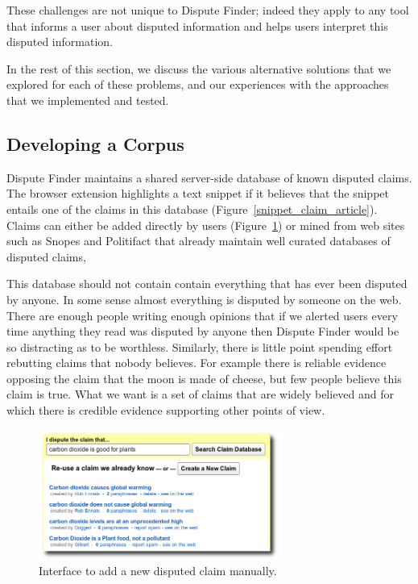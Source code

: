 \documentclass{www2010-accepted}
\begin{document}
These challenges are not unique to Dispute Finder; indeed they apply to any tool that informs a user about disputed information and helps users interpret this disputed information.

In the rest of this section, we discuss the various alternative solutions that we explored for each of these problems, and our experiences with the approaches that we implemented and tested.


\subsection{Developing a Corpus}
\label{sec:disputed}

Dispute Finder maintains a shared server-side database of known disputed claims. The browser extension highlights a text snippet if it believes that the snippet entails one of the claims in this database (Figure~\ref{snippet_claim_article}). Claims can either be added directly by users (Figure~\ref{add_claim}) or mined from web sites such as Snopes and Politifact that already maintain well curated databases of disputed claims, 

This database should not contain contain everything that has ever been disputed by anyone. In some sense almost everything is disputed by someone on the web. There are enough people writing enough opinions that if we alerted users every time anything they read was disputed by anyone then Dispute Finder would be so distracting as to be worthless. Similarly, there is little point spending effort rebutting claims that nobody believes. For example there is reliable evidence opposing the claim that the moon is made of cheese, but few people believe this claim is true. What we want is a set of claims that are widely believed and for which there is credible evidence supporting other points of view.

\begin{figure}[tb]
	\begin{center}
	\includegraphics[width=8cm]{pictures/add_claim_list.png}
	\caption{Interface to add a new disputed claim manually.}
	\label{add_claim}
	\end{center}
\end{figure}
\end{document}
